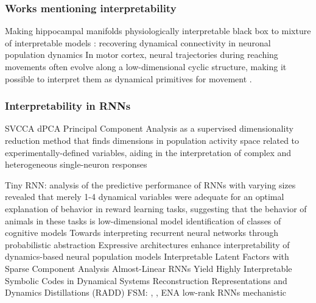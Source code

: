 \documentclass{article}
\theoremstyle{definition} \newtheorem{definition}{Definition}  \newtheorem{example}{Example}
\theoremstyle{remark} \newtheorem{remark}{Remark}
\newcounter{ct}
\begin{document}
\subsubsection{Works mentioning interpretability}
\citep{whiteway2019interpretable}
\citep{kar2022interpretability}
 Making hippocampal manifolds physiologically interpretable \citep{esparza2023interpretable}
black box to mixture of interpretable models \citep{ghosh2023blackbox}
\citep{schneider2023learnable}
\citep{brenner2024almost}
\citep{menier2025interpretable}
\citep{nonnenmacher2017extracting}
\citep{zhang2025netformer}: recovering dynamical connectivity in neuronal population dynamics
\citep{klindt2023identifying,klindt2025superposition}
In motor cortex, neural trajectories during reaching movements often evolve along a low-dimensional cyclic structure, making it possible to interpret them as dynamical primitives for movement \citep{ijspeert2013dynamical}.

\citep{marton2021efficient}


\subsubsection{Interpretability in RNNs}
SVCCA\citep{raghu2017svcca}
dPCA\citep{kobak2016demixed} Principal Component Analysis as a supervised dimensionality reduction method that finds dimensions in population activity space related to experimentally-defined variables, aiding in the interpretation of complex and heterogeneous single-neuron responses

Tiny RNN\citep{jian2023tinyrnn}: analysis of the predictive performance of RNNs with varying sizes revealed that merely 1-4 dynamical variables were adequate for an optimal explanation of behavior in reward learning tasks, suggesting that the behavior of animals in these tasks is low-dimensional
model identification of classes of cognitive models\citep{rmus2024artificial}
Towards interpreting recurrent neural networks through probabilistic abstraction \citep{dong2020towards}
Expressive architectures enhance interpretability of dynamics-based neural population models \citep{sedler2023expressive}
Interpretable Latent Factors with Sparse Component Analysis \citep{zimnik2024identifying}
Almost-Linear RNNs Yield Highly Interpretable Symbolic Codes in Dynamical Systems Reconstruction \citep{brenner2024almost}
\citep{he2024multilevel}
\citep{schaeffer2020reverseengineering} Representations and Dynamics Distillations (RADD)
\citep{turner2023simplicity}
FSM: \citep{oliva2019fsm}, \citep{cotteret2024fsm},  ENA \citep{ceni2020interpreting}
low-rank RNNs \citep{beiran2021shaping, valente2022extracting, valente2022probing}
mechanistic \citep{qian2024partial}
\citep{Nassar2018b}
\end{document}
